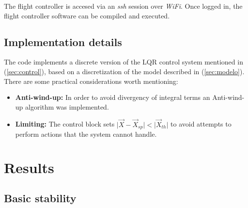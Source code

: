 \documentclass[conference]{IEEEtran}
\newcommand{\refp}[1]{(\ref{#1})}
\begin{document}
The flight controller is accesed via an \textit{ssh} session over \textit{WiFi}. Once logged in, the flight controller software can be compiled and executed.

\subsection{Implementation details}
\label{sec:software-impl}

The code implements a discrete version of the LQR control system mentioned in \refp{sec:control}, based on a discretization of the model described in \refp{sec:modelo}. There are some practical considerations worth mentioning:
\begin{itemize}
\item \textbf{Anti-wind-up:} In order to avoid divergency of integral terms an Anti-wind-up algorithm was implemented.
\item \textbf{Limiting:} The control block sets $\vert \vec{X} - \vec{X}_{sp}\vert < \vert \vec{X}_{th} \vert$ to avoid attempts to perform actions that the system cannot handle.
\end{itemize}


\section{Results}
\label{sec:results-tests}

\subsection{Basic stability}
\end{document}
